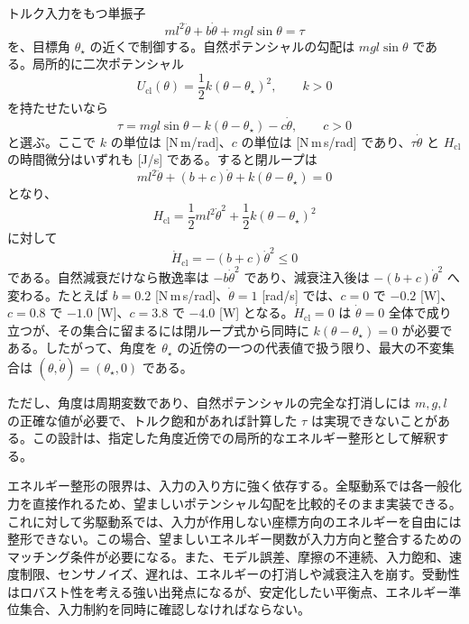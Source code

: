 \begin{example}[単振子の局所的な重力補償とポテンシャル整形]
トルク入力をもつ単振子
\begin{equation}
  ml^2\ddot{\theta}+b\dot{\theta}+mgl\sin\theta=\tau
\end{equation}
を、目標角 $\theta_\star$ の近くで制御する。自然ポテンシャルの勾配は $mgl\sin\theta$ である。局所的に二次ポテンシャル
\begin{equation}
  U_\mathrm{cl}(\theta)=\frac{1}{2}k(\theta-\theta_\star)^2,\qquad k>0
\end{equation}
を持たせたいなら
\begin{equation}
  \tau=mgl\sin\theta-k(\theta-\theta_\star)-c\dot{\theta},
  \qquad c>0
\end{equation}
と選ぶ。ここで $k$ の単位は [N\,m/rad]、$c$ の単位は [N\,m\,s/rad] であり、$\tau\dot{\theta}$ と $H_\mathrm{cl}$ の時間微分はいずれも [J/s] である。すると閉ループは
\begin{equation}
  ml^2\ddot{\theta}+(b+c)\dot{\theta}+k(\theta-\theta_\star)=0
\end{equation}
となり、
\begin{equation}
  H_\mathrm{cl}
  =
  \frac{1}{2}ml^2\dot{\theta}^2+\frac{1}{2}k(\theta-\theta_\star)^2
\end{equation}
に対して
\begin{equation}
  \dot{H}_\mathrm{cl}=-(b+c)\dot{\theta}^2\le0
\end{equation}
である。自然減衰だけなら散逸率は $-b\dot{\theta}^2$ であり、減衰注入後は $-(b+c)\dot{\theta}^2$ へ変わる。たとえば $b=0.2$ [N\,m\,s/rad]、$\dot{\theta}=1$ [rad/s] では、$c=0$ で $-0.2$ [W]、$c=0.8$ で $-1.0$ [W]、$c=3.8$ で $-4.0$ [W] となる。$\dot{H}_\mathrm{cl}=0$ は $\dot{\theta}=0$ 全体で成り立つが、その集合に留まるには閉ループ式から同時に $k(\theta-\theta_\star)=0$ が必要である。したがって、角度を $\theta_\star$ の近傍の一つの代表値で扱う限り、最大の不変集合は $(\theta,\dot{\theta})=(\theta_\star,0)$ である。

ただし、角度は周期変数であり、自然ポテンシャルの完全な打消しには $m,g,l$ の正確な値が必要で、トルク飽和があれば計算した $\tau$ は実現できないことがある。この設計は、指定した角度近傍での局所的なエネルギー整形として解釈する。
\end{example}

エネルギー整形の限界は、入力の入り方に強く依存する。全駆動系では各一般化力を直接作れるため、望ましいポテンシャル勾配を比較的そのまま実装できる。これに対して劣駆動系では、入力が作用しない座標方向のエネルギーを自由には整形できない。この場合、望ましいエネルギー関数が入力方向と整合するためのマッチング条件が必要になる。また、モデル誤差、摩擦の不連続、入力飽和、速度制限、センサノイズ、遅れは、エネルギーの打消しや減衰注入を崩す。受動性はロバスト性を考える強い出発点になるが、安定化したい平衡点、エネルギー準位集合、入力制約を同時に確認しなければならない。

